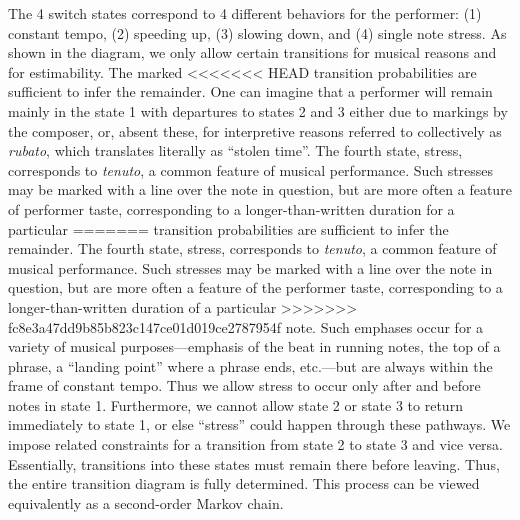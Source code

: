 \documentclass[aoas]{imsart}
\begin{document}
The 4 switch states correspond to 4 different behaviors for the
performer: (1) constant tempo, (2) speeding up, (3) slowing down, and
(4) single note stress. As shown in the diagram, we only allow certain
transitions for musical reasons and for estimability. The marked
<<<<<<< HEAD
transition probabilities are sufficient to infer the remainder. One
can imagine that a performer will remain mainly in the state 1 with
departures to states 2 and 3 either due to markings by the composer,
or, absent these, for interpretive reasons referred to collectively as
{\em rubato}, which
translates literally as ``stolen time''. The fourth
state, stress, corresponds to {\em tenuto}, a common feature of
musical performance. Such stresses may be marked with a line over the
note in question, but are more often a feature of performer taste,
corresponding to a longer-than-written duration for a particular
=======
transition probabilities are sufficient to infer the remainder. The fourth
state, stress, corresponds to {\em tenuto}, a common feature of
musical performance. Such stresses may be marked with a line over the
note in question, but are more often a feature of the performer taste,
corresponding to a longer-than-written duration of a particular
>>>>>>> fc8e3a47dd9b85b823c147ce01d019ce2787954f
note. Such emphases occur for a variety of musical purposes---emphasis
of the beat in running notes, the top of a
phrase, a ``landing point'' where a phrase ends, etc.---but are always
within the frame of constant tempo. Thus we allow stress to occur only
after and before notes in state 1. Furthermore, we cannot allow
state 2 or state 3 to return immediately to state 1, or else ``stress'' could
happen through these pathways. We impose related constraints for a transition from state 2
to state 3 and vice versa. Essentially, transitions into these states must remain
there before leaving. Thus, the entire transition diagram is
fully determined. This process can  be viewed equivalently as a
second-order Markov chain.
\end{document}
